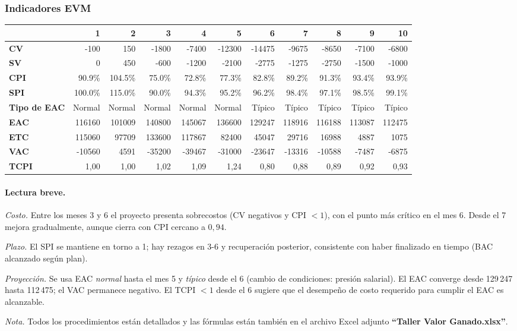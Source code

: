 \subsubsection*{Indicadores EVM}
\begin{table}[H]\centering\small
\begin{tabular}{lrrrrrrrrrr}
\toprule
 & \textbf{1} & \textbf{2} & \textbf{3} & \textbf{4} & \textbf{5} & \textbf{6} & \textbf{7} & \textbf{8} & \textbf{9} & \textbf{10} \\
\midrule
\textbf{CV}   & -100 & 150 & -1800 & -7400 & -12300 & -14475 & -9675 & -8650 & -7100 & -6800 \\
\textbf{SV}   & 0 & 450 & -600 & -1200 & -2100 & -2775 & -1275 & -2750 & -1500 & -1000 \\
\textbf{CPI}  & 90.9\% & 104.5\% & 75.0\% & 72.8\% & 77.3\% & 82.8\% & 89.2\% & 91.3\% & 93.4\% & 93.9\% \\
\textbf{SPI}  & 100.0\% & 115.0\% & 90.0\% & 94.3\% & 95.2\% & 96.2\% & 98.4\% & 97.1\% & 98.5\% & 99.1\% \\
\midrule
\textbf{Tipo de EAC} & Normal & Normal & Normal & Normal & Normal & T\'ipico & T\'ipico & T\'ipico & T\'ipico & T\'ipico \\
\textbf{EAC}  & 116160 & 101009 & 140800 & 145067 & 136600 & 129247 & 118916 & 116188 & 113087 & 112475 \\
\textbf{ETC}  & 115060 & 97709 & 133600 & 117867 & 82400 & 45047 & 29716 & 16988 & 4887 & 1075 \\
\textbf{VAC}  & -10560 & 4591 & -35200 & -39467 & -31000 & -23647 & -13316 & -10588 & -7487 & -6875 \\
\textbf{TCPI} & 1{,}00 & 1{,}00 & 1{,}02 & 1{,}09 & 1{,}24 & 0{,}80 & 0{,}88 & 0{,}89 & 0{,}92 & 0{,}93 \\
\bottomrule
\end{tabular}
\end{table}

\paragraph{Lectura breve.}
\textit{Costo.} Entre los meses 3 y 6 el proyecto presenta sobrecostos (CV negativos y CPI \(<1\)), con el punto m\'as cr\'itico en el mes 6. Desde el 7 mejora gradualmente, aunque cierra con CPI cercano a \(0{,}94\).

\medskip
\textit{Plazo.} El SPI se mantiene en torno a 1; hay rezagos en 3-6 y recuperaci\'on posterior, consistente con haber finalizado en tiempo (BAC alcanzado seg\'un plan).

\medskip
\textit{Proyecci\'on.} Se usa EAC \emph{normal} hasta el mes 5 y \emph{t\'ipico} desde el 6 (cambio de condiciones: presi\'on salarial). El EAC converge desde 129\,247 hasta 112\,475; el VAC permanece negativo. El TCPI \(<1\) desde el 6 sugiere que el desempe\~no de costo requerido para cumplir el EAC es alcanzable.

\bigskip
\textit{Nota.} Todos los procedimientos están detallados y las fórmulas están también en el archivo Excel adjunto \textbf{``Taller Valor Ganado.xlsx''}.
